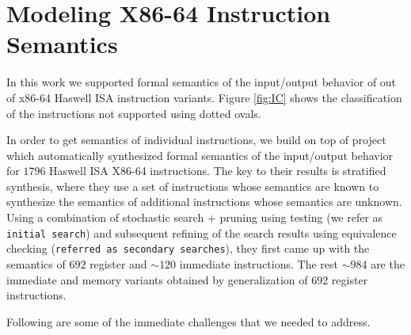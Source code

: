 
\section{Modeling X86-64 Instruction Semantics} \label{sec:modelI}


In this work we supported formal semantics of the input/output behavior of
\supp{} out of \total{} x86-64 Haswell ISA instruction variants. Figure \ref{fig:IC} shows the classification of the instructions not supported using dotted ovals.  


In order to get semantics of individual instructions, we build on top of project
\Strata~\cite{Heule2016a} which automatically synthesized formal semantics  of
the input/output behavior for $1796$ Haswell ISA X86-64 instructions. The key to
their results is stratified synthesis, where they use a set of instructions
whose semantics are known to synthesize the semantics of additional instructions
whose semantics are unknown. Using a  combination of 
stochastic search + pruning using testing (we refer as {\tt initial search}) and subsequent refining of the search results using equivalence checking ({\tt referred as secondary searches}), they first came up with the
semantics of $692$ register and $\sim120$ immediate instructions. The rest
$\sim984$ are the immediate and memory variants obtained by generalization of
$692$ register instructions.     




Following are some of the immediate challenges that we needed to address.

